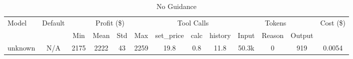 \begin{table}[h]
\centering
\small
\caption{No Guidance}
\begin{tabular}{|l|c|c|c|c|c|c|c|c|c|c|c|c|}
\hline
\multirow{2}{*}{Model} & \multirow{2}{*}{Default} & \multicolumn{4}{c|}{Profit (\$)} & \multicolumn{3}{c|}{Tool Calls} & \multicolumn{3}{c|}{Tokens} & \multirow{2}{*}{Cost (\$)} \\
\cline{3-12}
& & Min & Mean & Std & Max & set\_price & calc & history & Input & Reason & Output & \\
\hline
unknown & N/A & 2175 & 2222 & 43 & 2259 & 19.8 & 0.8 & 11.8 & 50.3k & 0 & 919 & 0.0054 \\
\hline
\end{tabular}
\end{table}